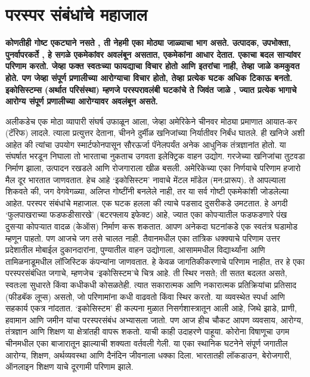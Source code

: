 \chapter{परस्पर संबंधांचे महाजाल }

\textcolor{blue!60!black}{\textbf{कोणतीही गोष्ट एकट्याने नसते , ती नेहमी एका मोठ्या जाळ्याचा भाग असते. उत्पादक, उपभोक्ता, पुनर्वापरकर्ते , हे सगळे एकमेकांवर अवलंबून असतात, एकमेकांना आधार देतात. एकाचा बदल साऱ्यांवर परिणाम करतो. जेव्हा फक्त स्वतःच्या फायद्याचा विचार होतो आणि इतरांचा नाही, तेव्हा जाळे कमकुवत होते. पण जेव्हा संपूर्ण प्रणालीच्या आरोग्याचा विचार होतो, तेव्हा प्रत्येक घटक अधिक टिकाऊ बनतो. इकोसिस्टम्स (अर्थात परिसंस्था) म्हणजे परस्परावलंबी घटकांचे ते जिवंत जाळे , ज्यात प्रत्येक भागाचे आरोग्य संपूर्ण प्रणालीच्या आरोग्यावर अवलंबून असते.}}

अलीकडेच एक मोठा व्यापारी संघर्ष उफाळून आला, जेव्हा अमेरिकेने चीनवर मोठ्या प्रमाणात आयात-कर (टॅरिफ) लादले. त्याला प्रत्युत्तर देताना, चीनने दुर्मीळ खनिजांच्या निर्यातीवर निर्बंध घातले. ही खनिजे अशी आहेत की त्यांचा उपयोग स्मार्टफोनपासून सौरऊर्जा पॅनेलपर्यंत अनेक आधुनिक तंत्रज्ञानांत होतो. या संघर्षात भरडून निघाला तो भारताचा नुकताच उगवता इलेक्ट्रिक वाहन उद्योग. गरजेच्या खनिजांचा तुटवडा निर्माण झाला, उत्पादन रखडले आणि रोजगाराला खीळ बसली. अमेरिकेच्या एका निर्णयाचे परिणाम हजारो मैल दूर भारतात जाणवतात. हेच आहे ‘इकोसिस्टम’ नावाचे मेंटल मॉडेल (मन:प्रारूप). ते आपल्याला शिकवते की, जग वेगवेगळ्या, अलिप्त गोष्टींनी बनलेले नाही, तर या सर्व गोष्टी एकमेकांशी जोडलेल्या आहेत. परस्पर संबंधांचे महाजाल. एक घटक हलला की त्याचे पडसाद दुसरीकडे उमटतात. हे अगदी ‘फुलपाखराच्या फडफडीसारखे’ (बटरफ्लाय इफेक्ट) आहे, ज्यात एका कोपऱ्यातील फडफडणारे पंख दुसऱ्या कोपऱ्यात वादळ (केऑस) निर्माण करू शकतात.
आपण अनेकदा घटनांकडे एक स्वतंत्र घडामोड म्हणून पाहतो. पण आजचे जग तसे चालत नाही. तैवानमधील एका तांत्रिक धक्क्याचे परिणाम उत्तर प्रदेशातील मोबाईल दुकानदारांना, पुण्यातील वाहन उद्योगाला, आसाममधील विद्यार्थ्यांना आणि तामिळनाडूमधील लॉजिस्टिक कंपन्यांना जाणवतात. हे केवळ जागतिकीकरणाचे परिणाम नाहीत, तर हे एका परस्परसंबंधित जगाचे, म्हणजेच ‘इकोसिस्टम’चे चित्र आहे. ती स्थिर नसते; ती सतत बदलत असते, स्वतःला सुधारते किंवा कधीकधी कोसळतेही. त्यात सकारात्मक आणि नकारात्मक प्रतिक्रियांचा प्रतिसाद (फीडबॅक लूप्स) असतो, जो परिणामांना कधी वाढवतो किंवा स्थिर करतो. या व्यवस्थेत स्पर्धा आणि सहकार्य एकत्र नांदतात. ‘इकोसिस्टम’ ही कल्पना मुळात निसर्गशास्त्रातून आली आहे, जिथे झाडे, प्राणी, हवामान आणि जमीन यांचा परस्परसंबंध अभ्यासला जातो. पण आज हीच चौकट आपण व्यवसाय, आरोग्य, तंत्रज्ञान आणि शिक्षण या क्षेत्रांतही वापरू शकतो. याची काही उदाहरणे पाहूया.
कोरोना विषाणूचा उगम चीनमधील एका बाजारातून झाल्याची शक्यता वर्तवली गेली. या एका स्थानिक घटनेने संपूर्ण जगातील आरोग्य, शिक्षण, अर्थव्यवस्था आणि दैनंदिन जीवनाला धक्का दिला. भारतातही लॉकडाउन, बेरोजगारी, ऑनलाइन शिक्षण याचे दूरगामी परिणाम झाले. 
